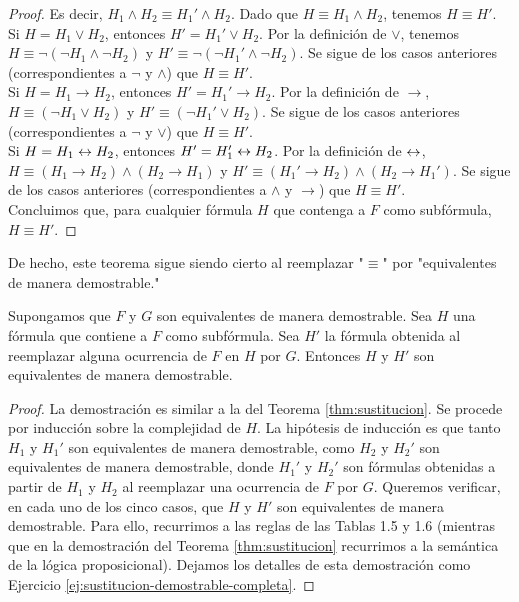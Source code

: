 \message{ !name(main.tex)}\documentclass[12pt,a4paper]{book}
\newcommand{\comillas}[1]{"#1"}
\begin{document}
\begin{proof}
        Es decir, $H_{1}\wedge H_{2}\equiv H_{1}'\wedge H_{2}$. Dado que $H\equiv H_{1}\wedge H_{2}$, tenemos $H\equiv H'$.\\
        Si $H=H_{1}\vee H_{2}$, entonces $H'=H_{1}'\vee H_{2}$. Por la definición de $\vee$, tenemos
        $H\equiv\neg(\neg H_{1}\wedge\neg H_{2})$ y $H'\equiv\neg(\neg H_{1}'\wedge\neg H_{2})$. Se sigue de los casos
        anteriores (correspondientes a $\neg$ y $\wedge$) que $H\equiv H'$.\\
        Si $H=H_{1}\rightarrow H_{2}$, entonces $H'=H_{1}'\rightarrow H_{2}$. Por la definición de $\rightarrow$,
        $H\equiv(\neg H_{1}\vee H_{2})$ y $H'\equiv(\neg H_{1}'\vee H_{2})$. Se sigue de los casos anteriores (correspondientes
        a $\neg$ y $\vee$) que $H\equiv H'$.\\
        Si $H=H_{1}\leftrightarrow H_{2}$, entonces $H'=H_{1}'\leftrightarrow H_{2}$. Por la definición de $\leftrightarrow$,
        $H\equiv(H_{1}\rightarrow H_{2})\wedge(H_{2}\rightarrow H_{1})$ y
        $H'\equiv(H_{1}'\rightarrow H_{2})\wedge(H_{2}\rightarrow H_{1}')$. Se sigue de los casos anteriores (correspondientes
        a $\wedge$ y $\rightarrow$) que $H\equiv H'$.\\
        Concluimos que, para cualquier fórmula $H$ que contenga a $F$ como subfórmula, $H\equiv H'$.
    \end{proof}

    De hecho, este teorema sigue siendo cierto al reemplazar \comillas{$\equiv$} por \comillas{equivalentes de manera
    demostrable.}

    \begin{teorema}\label{thm:sustitucion-demostrable}
        Supongamos que $F$ y $G$ son equivalentes de manera demostrable. Sea $H$ una fórmula que contiene a $F$ como
        subfórmula. Sea $H'$ la fórmula obtenida al reemplazar alguna ocurrencia de $F$ en $H$ por $G$. Entonces $H$ y $H'$
        son equivalentes de manera demostrable.
    \end{teorema}
    \begin{proof}
        La demostración es similar a la del Teorema \ref{thm:sustitucion}. Se procede por inducción sobre la complejidad de
        $H$. La hipótesis de inducción es que tanto $H_{1}$ y $H_{1}'$ son equivalentes de manera demostrable, como $H_{2}$ y
        $H_{2}'$ son equivalentes de manera demostrable, donde $H_{1}'$ y $H_{2}'$ son fórmulas obtenidas a partir de $H_{1}$ y
        $H_{2}$ al reemplazar una ocurrencia de $F$ por $G$. Queremos verificar, en cada uno de los cinco casos, que $H$ y $H'$
        son equivalentes de manera demostrable. Para ello, recurrimos a las reglas de las Tablas 1.5 y 1.6 (mientras que en la
        demostración del Teorema \ref{thm:sustitucion} recurrimos a la semántica de la lógica proposicional). Dejamos los
        detalles de esta demostración como Ejercicio \ref{ej:sustitucion-demostrable-completa}.
    \end{proof}
\end{document}

